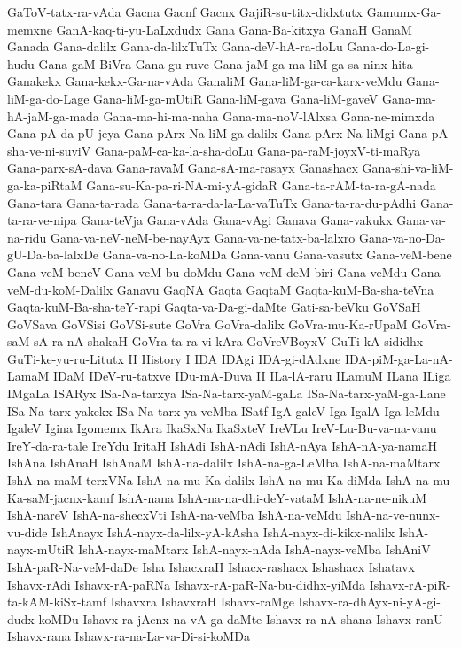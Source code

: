 {GaToV-tatx-ra-vAda
Gacna
Gacnf
Gacnx
GajiR-su-titx-didxtutx
Gamumx-Ga-memxne
GanA-kaq-ti-yu-LaLxdudx
Gana
Gana-Ba-kitxya
GanaH
GanaM
Ganada
Gana-dalilx
Gana-da-lilxTuTx
Gana-deV-hA-ra-doLu
Gana-do-La-gi-hudu
Gana-gaM-BiVra
Gana-gu-ruve
Gana-jaM-ga-ma-liM-ga-sa-ninx-hita
Ganakekx
Gana-kekx-Ga-na-vAda
GanaliM
Gana-liM-ga-ca-karx-veMdu
Gana-liM-ga-do-Lage
Gana-liM-ga-mUtiR
Gana-liM-gava
Gana-liM-gaveV
Gana-ma-hA-jaM-ga-mada
Gana-ma-hi-ma-naha
Gana-ma-noV-lAlxsa
Gana-ne-mimxda
Gana-pA-da-pU-jeya
Gana-pArx-Na-liM-ga-dalilx
Gana-pArx-Na-liMgi
Gana-pA-sha-ve-ni-suviV
Gana-paM-ca-ka-la-sha-doLu
Gana-pa-raM-joyxV-ti-maRya
Gana-parx-sA-dava
Gana-ravaM
Gana-sA-ma-rasayx
Ganashacx
Gana-shi-va-liM-ga-ka-piRtaM
Gana-su-Ka-pa-ri-NA-mi-yA-gidaR
Gana-ta-rAM-ta-ra-gA-nada
Gana-tara
Gana-ta-rada
Gana-ta-ra-da-la-La-vaTuTx
Gana-ta-ra-du-pAdhi
Gana-ta-ra-ve-nipa
Gana-teVja
Gana-vAda
Gana-vAgi
Ganava
Gana-vakukx
Gana-va-na-ridu
Gana-va-neV-neM-be-nayAyx
Gana-va-ne-tatx-ba-lalxro
Gana-va-no-Da-gU-Da-ba-lalxDe
Gana-va-no-La-koMDa
Gana-vanu
Gana-vasutx
Gana-veM-bene
Gana-veM-beneV
Gana-veM-bu-doMdu
Gana-veM-deM-biri
Gana-veMdu
Gana-veM-du-koM-Dalilx
Ganavu
GaqNA
Gaqta
GaqtaM
Gaqta-kuM-Ba-sha-teVna
Gaqta-kuM-Ba-sha-teY-rapi
Gaqta-va-Da-gi-daMte
Gati-sa-beVku
GoVSaH
GoVSava
GoVSisi
GoVSi-sute
GoVra
GoVra-dalilx
GoVra-mu-Ka-rUpaM
GoVra-saM-sA-ra-nA-shakaH
GoVra-ta-ra-vi-kAra
GoVreVBoyxV
GuTi-kA-sididhx
GuTi-ke-yu-ru-Litutx
H
History
I
IDA
IDAgi
IDA-gi-dAdxne
IDA-piM-ga-La-nA-LamaM
IDaM
IDeV-ru-tatxve
IDu-mA-Duva
II
ILa-lA-raru
ILamuM
ILana
ILiga
IMgaLa
ISARyx
ISa-Na-tarxya
ISa-Na-tarx-yaM-gaLa
ISa-Na-tarx-yaM-ga-Lane
ISa-Na-tarx-yakekx
ISa-Na-tarx-ya-veMba
ISatf
IgA-galeV
Iga
IgalA
Iga-leMdu
IgaleV
Igina
Igomemx
IkAra
IkaSxNa
IkaSxteV
IreVLu
IreV-Lu-Bu-va-na-vanu
IreY-da-ra-tale
IreYdu
IritaH
IshAdi
IshA-nAdi
IshA-nAya
IshA-nA-ya-namaH
IshAna
IshAnaH
IshAnaM
IshA-na-dalilx
IshA-na-ga-LeMba
IshA-na-maMtarx
IshA-na-maM-terxVNa
IshA-na-mu-Ka-dalilx
IshA-na-mu-Ka-diMda
IshA-na-mu-Ka-saM-jacnx-kamf
IshA-nana
IshA-na-na-dhi-deY-vataM
IshA-na-ne-nikuM
IshA-nareV
IshA-na-shecxVti
IshA-na-veMba
IshA-na-veMdu
IshA-na-ve-nunx-vu-dide
IshAnayx
IshA-nayx-da-lilx-yA-kAsha
IshA-nayx-di-kikx-nalilx
IshA-nayx-mUtiR
IshA-nayx-maMtarx
IshA-nayx-nAda
IshA-nayx-veMba
IshAniV
IshA-paR-Na-veM-daDe
Isha
IshacxraH
Ishacx-rashacx
Ishashacx
Ishatavx
Ishavx-rAdi
Ishavx-rA-paRNa
Ishavx-rA-paR-Na-bu-didhx-yiMda
Ishavx-rA-piR-ta-kAM-kiSx-tamf
Ishavxra
IshavxraH
Ishavx-raMge
Ishavx-ra-dhAyx-ni-yA-gi-dudx-koMDu
Ishavx-ra-jAcnx-na-vA-ga-daMte
Ishavx-ra-nA-shana
Ishavx-ranU
Ishavx-rana
Ishavx-ra-na-La-va-Di-si-koMDa
}
